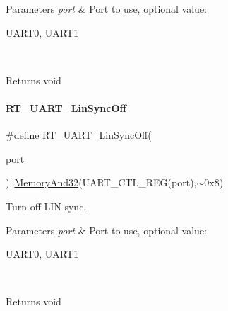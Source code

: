 \begin{DoxyParams}{Parameters}
{\em port} & Port to use, optional value\+:
\begin{DoxyCode}
\mbox{\hyperlink{a00173_a0508661f121639ffdee7de2353a0def2}{UART0}}, \mbox{\hyperlink{a00173_a8d69bf04d07af4fbbab5a8bd291f65ff}{UART1}}
\end{DoxyCode}
 \\
\hline
\end{DoxyParams}
\begin{DoxyReturn}{Returns}
void 
\end{DoxyReturn}
\mbox{\label{a00173_aea01869278bc3c4e332af854c4e660be}} 
\paragraph{\texorpdfstring{R\+T\+\_\+\+U\+A\+R\+T\+\_\+\+Lin\+Sync\+Off}{RT\_UART\_LinSyncOff}}
{\footnotesize\ttfamily \#define R\+T\+\_\+\+U\+A\+R\+T\+\_\+\+Lin\+Sync\+Off(\begin{DoxyParamCaption}\item[{}]{port }\end{DoxyParamCaption})~\mbox{\hyperlink{a00068_ad87cedffcaadc51db22594fce55173d4}{Memory\+And32}}(U\+A\+R\+T\+\_\+\+C\+T\+L\+\_\+\+R\+EG(port),$\sim$0x8)}



Turn off L\+IN sync. 


\begin{DoxyParams}{Parameters}
{\em port} & Port to use, optional value\+:
\begin{DoxyCode}
\mbox{\hyperlink{a00173_a0508661f121639ffdee7de2353a0def2}{UART0}}, \mbox{\hyperlink{a00173_a8d69bf04d07af4fbbab5a8bd291f65ff}{UART1}}
\end{DoxyCode}
 \\
\hline
\end{DoxyParams}
\begin{DoxyReturn}{Returns}
void 
\end{DoxyReturn}
\mbox{\label{a00173_a49f9d43f5fd87ceed952123010e015fa}} 
